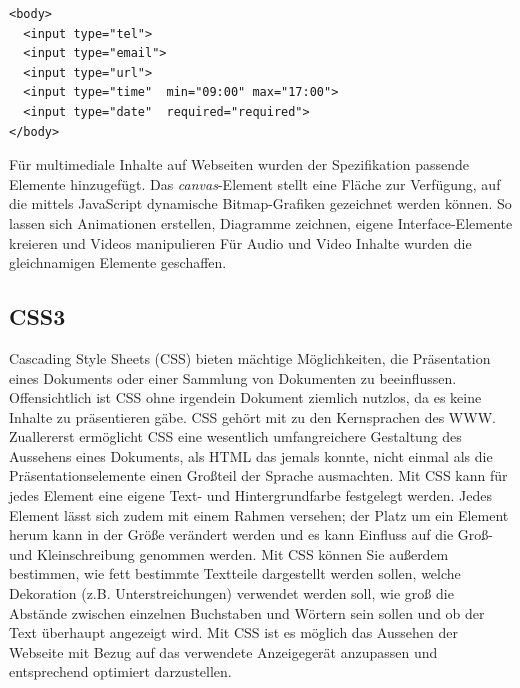 \documentclass[12pt,a4paper,bibliography=totocnumbered,listof=totocnumbered]{scrartcl}
\begin{document}
    \vspace{1em}
	\begin{lstlisting}[caption=HTML5 \textit{input}-Element, label=lst:html5input]
<body>
  <input type="tel">
  <input type="email">
  <input type="url">  
  <input type="time"  min="09:00" max="17:00">
  <input type="date"  required="required">
</body>
	\end{lstlisting}
	
Für multimediale Inhalte auf Webseiten wurden der Spezifikation passende Elemente hinzugefügt. Das \textit{canvas}-Element \glqq [...] stellt eine Fläche zur Verfügung, auf die mittels JavaScript dynamische Bitmap-Grafiken gezeichnet werden können. So lassen sich Animationen erstellen, Diagramme zeichnen, eigene Interface-Elemente kreieren und Videos manipulieren\grqq{}\cite[S.353]{KronHTML2011} Für Audio und Video Inhalte wurden die gleichnamigen Elemente geschaffen. 
	
\subsection{CSS3}
\glqq Cascading Style Sheets (CSS) bieten mächtige Möglichkeiten, die Präsentation eines Dokuments oder einer Sammlung von Dokumenten zu beeinflussen. Offensichtlich ist CSS ohne irgendein Dokument ziemlich nutzlos, da es keine Inhalte zu präsentieren gäbe.\grqq{}\cite[S.1]{MeyeCasc2005} CSS gehört mit zu den Kernsprachen des WWW. \glqq Zuallererst ermöglicht CSS eine wesentlich umfangreichere Gestaltung des Aussehens eines Dokuments, als HTML das jemals konnte, nicht einmal als die Präsentationselemente einen Großteil der Sprache ausmachten. Mit CSS kann für jedes Element eine eigene Text- und Hintergrundfarbe festgelegt werden. Jedes Element lässt sich zudem mit einem Rahmen versehen; der Platz um ein Element herum kann in der Größe verändert werden und es kann Einfluss auf die Groß- und Kleinschreibung genommen werden. Mit CSS können Sie außerdem  bestimmen, wie fett bestimmte Textteile dargestellt werden sollen, welche Dekoration (z.B. Unterstreichungen) verwendet werden soll, wie groß die Abstände zwischen einzelnen Buchstaben und Wörtern sein sollen und ob der Text überhaupt angezeigt wird.\grqq{}\cite[S.4]{MeyeCasc2005} Mit CSS ist es möglich das Aussehen der Webseite mit Bezug auf das verwendete Anzeigegerät anzupassen und entsprechend optimiert darzustellen.
\end{document}
